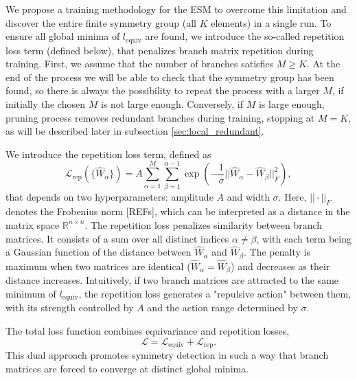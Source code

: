 We propose a training methodology for the ESM to overcome this limitation and discover the entire finite symmetry group (all $K$ elements) in a single run. To ensure all global minima of $l_{\mathrm{equiv}}$ are found, we introduce the so-called repetition loss term (defined below), that penalizes branch matrix repetition during training. First, we assume that the number of branches satisfies $M \geq K$. At the end of the process we will be able to check that the symmetry group has been found, so there is always the possibility to repeat the process with a larger $M$, if initially the chosen $M$ is not large enough. Conversely, if $M$ is large enough, pruning process removes redundant branches during training, stopping at $M = K$, as will be described later in subsection \ref{sec:local_redundant}.


We introduce the repetition loss term, defined as
\begin{equation}\label{eq:l_rep}
  \mathcal{L}_{\mathrm{rep}} \left( \{ \hat{W}_{\alpha} \} \right) = A \sum_{\alpha = 1}^{M} \sum_{\beta = 1}^{\alpha - 1} \exp{ \left( -\frac{1}{\sigma} || \hat{W}_{\alpha} - \hat{W}_{\beta} ||_{F}^2 \right) },
\end{equation}
that depends on two hyperparameters: amplitude $A$ and width $\sigma$. Here, $|| \cdot ||_{F}$ denotes the Frobenius norm [REFs], which can be interpreted as a distance in the matrix space $\mathbb{R}^{n \times n}$. The repetition loss penalizes similarity between branch matrices. It consists of a sum over all distinct indices $\alpha \neq \beta$, with each term being a Gaussian function of the distance between $\hat{W}_{\alpha}$ and $\hat{W}_{\beta}$. The penalty is maximum when two matrices are identical ($\hat{W}_{\alpha} = \hat{W}_{\beta}$) and decreases as their distance increases. Intuitively, if two branch matrices are attracted to the same minimum of $l_{\mathrm{equiv}}$, the repetition loss generates a "repulsive action" between them, with its strength controlled by $A$ and the action range determined by $\sigma$.


The total loss function combines equivariance and repetition losses,
\begin{equation}\label{eq:loss}
  \mathcal{L} = \mathcal{L}_{\mathrm{equiv}} + \mathcal{L}_{\mathrm{rep}}.
\end{equation}
This dual approach promotes symmetry detection in such a way that branch matrices are forced to converge at distinct global minima.

